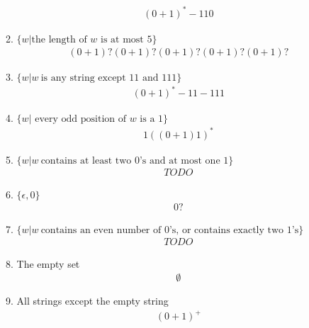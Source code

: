 \begin{enumerate}
\begin{enumerate}
                    \begin{align*}
                        (0+1)^*- 110
                    \end{align*}
              \item $\{w|\text{the length of }w\text{ is at most }5\}$
                    \begin{align*}
                        (0+1)?(0+1)?(0+1)?(0+1)?(0+1)?
                    \end{align*}
              \item $\{w|w~ \text{is any string except }11\text{ and }111\}$
                    \begin{align*}
                        (0+1)^* - 11 - 111
                    \end{align*}
              \item $\{w|\text{ every odd position of }w\text{ is a }1\}$
                    \begin{align*}
                        1((0+1)1)^*
                    \end{align*}
              \item $\{w|w~ \text{contains at least two }0\text{'s and at most one }1\}$
                    \begin{align*}
                        TODO
                    \end{align*}
              \item $\{\epsilon,0\}$
                    \begin{align*}
                        0?
                    \end{align*}
              \item $\{w|w~ \text{contains an even number of }0\text{'s, or contains exactly two }1\text{'s}\}$
                    \begin{align*}
                        TODO
                    \end{align*}
              \item The empty set
                    \begin{align*}
                        \emptyset
                    \end{align*}
              \item All strings except the empty string
                    \begin{align*}
                        (0+1)^+
                    \end{align*}
          \end{enumerate}
\end{enumerate}
